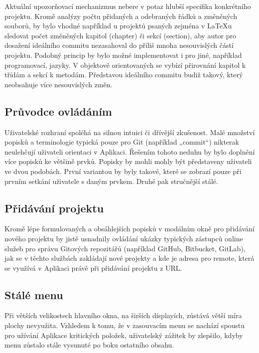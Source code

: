 Aktuální upozorňovací mechanizmus nebere v potaz hlubší specifika konkrétního projektu. Kromě analýzy počtu přidaných a odebraných řádků a změněných souborů, by bylo vhodné například u projektů psaných zejména v \LaTeX{u} sledovat počet změněných kapitol (chapter) či sekcí (section), aby autor pro dosažení ideálního commitu nezasahoval do příliš mnoha nesouvislých částí projektu. Podobný princip by bylo možné implementovat i pro jiné, například programovací, jazyky. V objektově orientovaných se vybízí přirovnání kapitol k třídám a sekcí k metodám. Představou ideálního commitu budiž takový, který neobsahuje více nesouvislých změn.

\subsection{Průvodce ovládáním}

Uživatelské rozhraní spoléhá na silnou intuici či dřívější zkušenost. Malé množství popisků a terminologie typická pouze pro Git (například „commit“) nikterak neulehčují uživateli orientaci v Aplikaci. Řešením tohoto neduhu by bylo doplnění více popisků ke většině prvků. Popisky by mohli mohly být představeny uživateli ve dvou podobách. První variantou by byly takové, které se zobrazí pouze při prvním setkání uživatele s daným prvkem. Druhé pak stručnější stálé.

\subsection{Přidávání projektu}

Kromě lépe formulovaných a obsáhlejších popisků v modálním okně pro přidávání nového projektu by jistě usnadnily ovládání ukázky typických zástupců online služeb pro správu Gitových repozitářů (například GitHub, Bitbucket, GitLab), jak se v těchto službách zakládají nové projekty a kde je adresa pro remote, která se využívá v Aplikaci právě při přidávání projektu z URL.

\subsection{Stálé menu}

Při větších velikostech hlavního okna, na širších displayích, zůstává větší míra plochy nevyužita. Vzhledem k tomu, že v zasouvacím menu se nachází spoustu pro užívání Aplikace kritických položek, uživatelský zážitek by zlepšilo, kdyby menu zůstalo stále vysunuté po boku ostatního obsahu.

